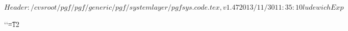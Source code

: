 %
%
%

\ProvidesPackageRCS[v\pgfversion] $Header: /cvsroot/pgf/pgf/generic/pgf/systemlayer/pgfsys.code.tex,v 1.47 2013/11/30 11:35:10 ludewich Exp $




\def\pgfset{\pgfqkeys{/pgf}}

\newif\ifpgfpicture


%
% 
{\catcode`\catcode`\t=12\gdef\Pgf@geT#1pt{#1}}

\def\pgf@sys@tonumber#1{\expandafter\Pgf@geT\the#1}

\def\pgf@sys@bp@correct#1{#1=0.99627#1}

\def\pgf@sys@bp#1{%
  {%
    \pgf@x=#1\relax%
    \pgf@x=0.99627\pgf@x%
    \edef\temp{\expandafter\Pgf@geT\the\pgf@x\space}%
    \pgfutil@toks@\expandafter\expandafter\expandafter{\expandafter\pgfsysprotocol@currentprotocol\temp}%
    \xdef\pgfsysprotocol@currentprotocol{\the\pgfutil@toks@}%
  }%
}
\def\pgf@sys@pt#1{%
  {%
    \pgf@x=#1\relax%
    \edef\temp{\expandafter\Pgf@geT\the\pgf@x\space}%
    \pgfutil@toks@\expandafter\expandafter\expandafter{\expandafter\pgfsysprotocol@currentprotocol\temp}%
    \xdef\pgfsysprotocol@currentprotocol{\the\pgfutil@toks@}%
  }%
}


\newdimen\pgf@x
\newdimen\pgf@y
\newdimen\pgf@xa
\newdimen\pgf@ya
\newdimen\pgf@xb
\newdimen\pgf@yb
\newdimen\pgf@xc
\newdimen\pgf@yc

\newwrite\w@pgf@writea
\newread\r@pgf@reada
\let\pgfutil@inputcheck=\r@pgf@reada

\newcount\c@pgf@counta
\newcount\c@pgf@countb
\newcount\c@pgf@countc
\newcount\c@pgf@countd

\newtoks\t@pgf@toka
\newtoks\t@pgf@tokb
\newtoks\t@pgf@tokc

\let\pgfmath@x\pgf@x
\let\pgfmath@xa\pgf@xa
\let\pgfmath@xb\pgf@xb
\let\pgfmath@xc\pgf@xc

